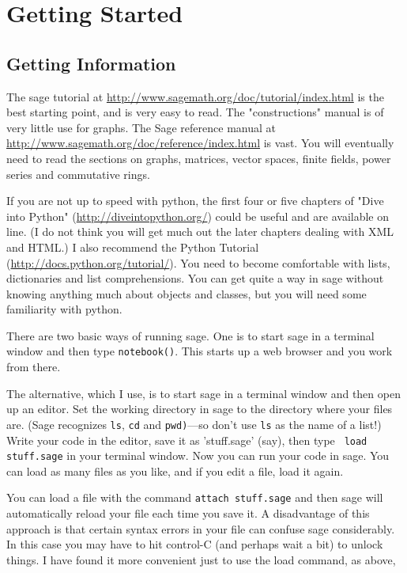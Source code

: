 
\chapter{Getting Started}
    
\section{Getting Information}

The sage tutorial at \url{http://www.sagemath.org/doc/tutorial/index.html}
is the best starting point, and is very easy to read.  The "constructions" manual 
is of very little use for graphs. The Sage reference manual at
\url{http://www.sagemath.org/doc/reference/index.html} is vast. You will eventually 
need to read the sections on graphs, matrices, vector spaces, finite fields,
power series and commutative rings.
                
If you are not up to speed with python, the first four or five chapters of 
"Dive into Python"  (\url{http://diveintopython.org/})
could be useful and are available on line.  (I do not think
you will get much out the later chapters dealing with XML and HTML.)
I also recommend the Python Tutorial (\url{http://docs.python.org/tutorial/}).  
You need to become comfortable with lists, dictionaries and list comprehensions.
You can get quite a way in sage without knowing anything much about objects 
and classes, but you will need some familiarity with python.

There are two basic ways of running sage.  One is to start sage in a
terminal window and then type \texttt{notebook()}.  This starts up a 
web browser and you work from there.
                 
The alternative, which I use, is to start sage in a terminal window and then 
open up an editor. Set the working directory in sage to the directory where your 
files are. (Sage recognizes \texttt{ls}, \texttt{cd} and \texttt{pwd)}---so don't use
\texttt{ls} as the name of a list!) Write your code in the editor, save it as
'stuff.sage' (say), then type  \texttt{ load stuff.sage} in your terminal window. 
Now you can run your code in sage. You can load as many files as you like, and if 
you edit a file, load it again.
                    
You can load a file with the command \texttt{attach stuff.sage} and then
sage will automatically reload your file each time
you save it.  A disadvantage of this approach is that certain syntax errors 
in your file can confuse sage considerably.  In this case you may have to 
hit control-C (and perhaps wait a bit) to unlock things.  I have found it more
convenient just to use the load command, as above,
                    
